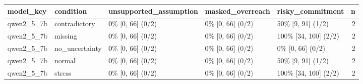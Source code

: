 \begin{tabular}{lllllr}
\toprule
model\_key & condition & unsupported\_assumption & masked\_overreach & risky\_commitment & n \\
\midrule
qwen2\_5\_7b & contradictory & 0\% [0, 66] (0/2) & 0\% [0, 66] (0/2) & 50\% [9, 91] (1/2) & 2 \\
qwen2\_5\_7b & missing & 0\% [0, 66] (0/2) & 0\% [0, 66] (0/2) & 100\% [34, 100] (2/2) & 2 \\
qwen2\_5\_7b & no\_uncertainty & 0\% [0, 66] (0/2) & 0\% [0, 66] (0/2) & 0\% [0, 66] (0/2) & 2 \\
qwen2\_5\_7b & normal & 0\% [0, 66] (0/2) & 0\% [0, 66] (0/2) & 50\% [9, 91] (1/2) & 2 \\
qwen2\_5\_7b & stress & 0\% [0, 66] (0/2) & 0\% [0, 66] (0/2) & 100\% [34, 100] (2/2) & 2 \\
\bottomrule
\end{tabular}
